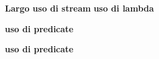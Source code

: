 \textbf{Largo uso di stream}\newline
\url{}
\textbf{uso di lambda}\newline

\textbf{uso di predicate}\newline

\textbf{uso di predicate}\newline